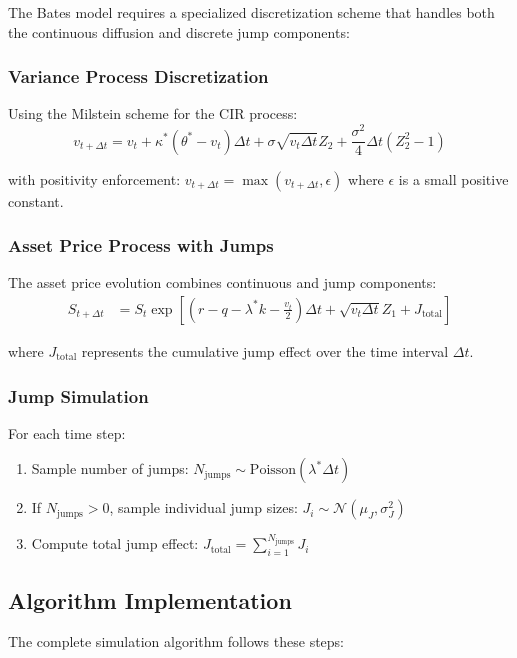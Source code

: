 \documentclass[12pt,a4paper]{article}
\begin{document}
The Bates model requires a specialized discretization scheme that handles both the continuous diffusion and discrete jump components:

\subsubsection{Variance Process Discretization}
Using the Milstein scheme for the CIR process:
\begin{equation}
v_{t+\Delta t} = v_t + \kappa^*(\theta^* - v_t)\Delta t + \sigma\sqrt{v_t \Delta t} Z_2 + \frac{\sigma^2}{4}\Delta t(Z_2^2 - 1)
\end{equation}

with positivity enforcement: $v_{t+\Delta t} = \max(v_{t+\Delta t}, \epsilon)$ where $\epsilon$ is a small positive constant.

\subsubsection{Asset Price Process with Jumps}
The asset price evolution combines continuous and jump components:
\begin{align}
S_{t+\Delta t} &= S_t \exp\left[(r - q - \lambda^*k - \frac{v_t}{2})\Delta t + \sqrt{v_t \Delta t} Z_1 + J_{\text{total}}\right]
\end{align}

where $J_{\text{total}}$ represents the cumulative jump effect over the time interval $\Delta t$.

\subsubsection{Jump Simulation}
For each time step:
\begin{enumerate}
    \item Sample number of jumps: $N_{\text{jumps}} \sim \text{Poisson}(\lambda^* \Delta t)$
    \item If $N_{\text{jumps}} > 0$, sample individual jump sizes: $J_i \sim \mathcal{N}(\mu_J, \sigma_J^2)$
    \item Compute total jump effect: $J_{\text{total}} = \sum_{i=1}^{N_{\text{jumps}}} J_i$
\end{enumerate}

\subsection{Algorithm Implementation}

The complete simulation algorithm follows these steps:
\end{document}
